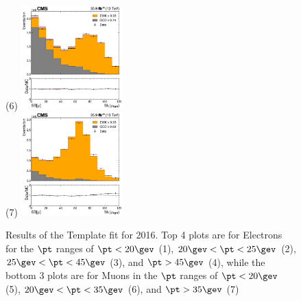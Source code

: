 \begin{figure}
  \subfigure(6) \includegraphics[width=0.35\textwidth]{template_fit/2016/mt_high_Muon_20.0.png} \\
  \subfigure(7) \includegraphics[width=0.35\textwidth]{template_fit/2016/mt_high_Muon_35.0.png}
  \caption{Results of the Template fit for 2016. Top 4 plots are for Electrons for the $\pt$ ranges of $\pt < 20\gev$ (1), $20\gev<\pt<25\gev$ (2), $25\gev<\pt<45\gev$ (3), and $\pt>45\gev$ (4), while the bottom 3 plots are for Muons in the $\pt$ ranges of $\pt < 20\gev$ (5), $20\gev<\pt<35\gev$ (6), and $\pt>35\gev$ (7)}
\end{figure}

